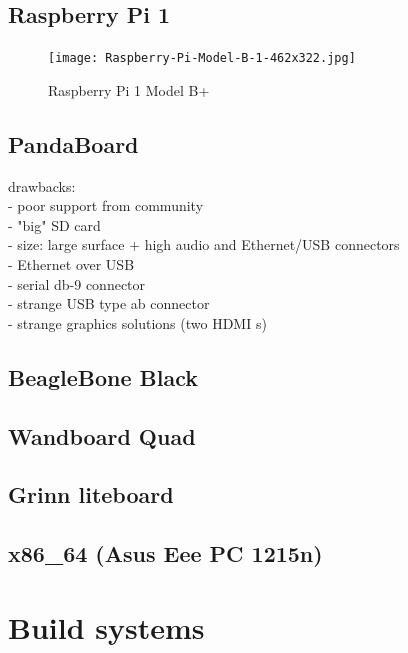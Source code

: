 \documentclass[printmode]{mgr}
\begin{document}
\section{Raspberry Pi 1}

\begin{figure}[htbp]
  \centering
    \texttt{[image: Raspberry-Pi-Model-B-1-462x322.jpg]}
  \caption{Raspberry Pi 1 Model B+}
  \label{fig:devboard-raspberrypi}
\end{figure}

\section{PandaBoard}

drawbacks:\\
- poor support from community\\
- "big" SD card\\
- size: large surface + high audio and Ethernet/USB connectors\\
- Ethernet over USB\\
- serial db-9 connector\\
- strange USB type ab connector\\
- strange graphics solutions (two HDMI s)\\

\section{BeagleBone Black}

\section{Wandboard Quad}

\section{Grinn liteboard}

\section{x86\_64 (Asus Eee PC 1215n)}

\chapter{Build systems}
\label{chapter:build systems}
\end{document}
